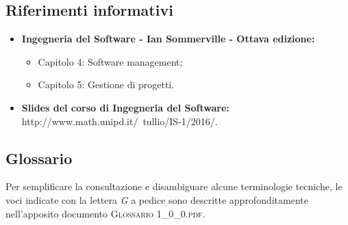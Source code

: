 \subsection{Riferimenti informativi}
\begin{itemize}
\item \textbf{Ingegneria del Software - Ian Sommerville - Ottava edizione:}
	\begin{itemize}
		\item Capitolo 4: Software management;
		\item Capitolo 5: Gestione di progetti.
	\end{itemize}
\item \textbf{Slides del corso di Ingegneria del Software:}\\http://www.math.unipd.it/~tullio/IS-1/2016/.
\end{itemize}

\subsection{Glossario}
Per semplificare la consultazione e disambiguare alcune terminologie tecniche, le voci indicate con la lettera \textit{G} a pedice sono descritte approfonditamente nell'apposito documento \textsc{Glossario 1\_0\_0.pdf}.